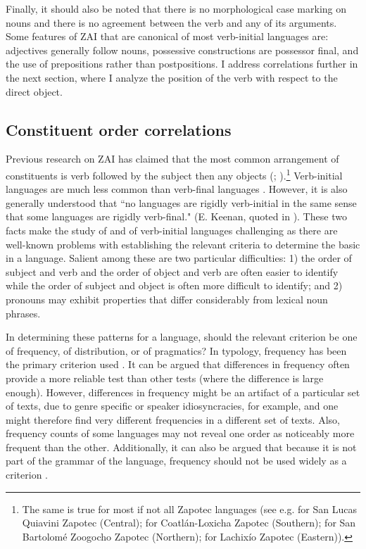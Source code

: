 Finally, it should also be noted that there is no morphological case marking on nouns and there is no agreement between the verb and any of its arguments. Some features of ZAI that are canonical of most verb-initial languages are: adjectives generally follow nouns, possessive constructions are possessor final, and the use of prepositions rather than postpositions. I address  correlations further in the next section, where I analyze the position of the verb with respect to the direct object.



\subsection{Constituent order correlations}\label{odercorrelationssection}

Previous research on ZAI has claimed that the most common arrangement of constituents is verb followed by the subject then any objects (\citealt{pickett1960}; \citealt{pickett1998}).\footnote{The same is true for most if not all Zapotec languages (see e.g. \citet{lee2000} for San Lucas Quiavini Zapotec (Central); \citet{beamdeazcona2004} for Coatl\'{a}n-Loxicha Zapotec (Southern); \citet{sonnenschein2005} for San Bartolom\'{e} Zoogocho Zapotec (Northern); \citet{sicoli2007} for Lachix\'{i}o Zapotec (Eastern)).} Verb-initial languages are much less common than verb-final languages \citep{payne1995}. However, it is also generally understood that ``no languages are rigidly verb-initial in the same sense that some languages are rigidly verb-final." (E. Keenan, quoted in \citet[455]{payne1995}). These two facts make the study of  and of verb-initial languages challenging as there are well-known problems with establishing the relevant criteria to determine the basic  in a language. Salient among these are two particular difficulties: 1) the order of subject and verb and the order of object and verb are often easier to identify while the order of subject and object is often more difficult to identify; and 2) pronouns may exhibit  properties that differ considerably from lexical noun phrases.

In determining these patterns for a language, should the relevant criterion be one of frequency, of distribution, or of pragmatics? In  typology, frequency has been the primary criterion used \citep{dryer2007}. It can be argued that differences in frequency often provide a more reliable test than other tests (where the difference is large enough). However, differences in frequency might be an artifact of a particular set of texts, due to genre specific or speaker idiosyncracies, for example, and one might therefore find very different frequencies in a different set of texts. Also, frequency counts of some languages may not reveal one order as noticeably more frequent than the other. Additionally, it can also be argued that because it is not part of the grammar of the language, frequency should not be used widely as a criterion \citep{dryer2007}.

